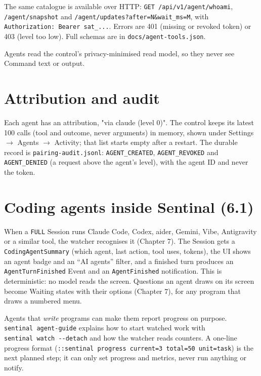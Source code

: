 The same catalogue is available over HTTP: \texttt{GET\ /\allowbreak{}api/\allowbreak{}v1/\allowbreak{}agent/\allowbreak{}whoami}, \texttt{/\allowbreak{}agent/\allowbreak{}snapshot} and \texttt{/\allowbreak{}agent/\allowbreak{}updates?after=\allowbreak{}N\&wait\_\allowbreak{}ms=\allowbreak{}M}, with \texttt{Authorization:\allowbreak{}\ Bearer\ sat\_\allowbreak{}.\allowbreak{}.\allowbreak{}.\allowbreak{}}. Errors are 401 (missing or revoked token) or 403 (level too low). Full schemas are in \texttt{docs/\allowbreak{}agent-{}\allowbreak{}tools.\allowbreak{}json}.

Agents read the control's privacy-minimised read model, so they never see Command text or output.

\section{\texorpdfstring{Attribution and audit}{Attribution and audit}}

Each agent has an attribution, "via claude (level 0)". The control keeps its latest 100 calls (tool and outcome, never arguments) in memory, shown under Settings $\rightarrow$ Agents $\rightarrow$ Activity; that list starts empty after a restart. The durable record is \texttt{pairing-{}\allowbreak{}audit.\allowbreak{}jsonl}: \texttt{AGENT\_\allowbreak{}CREATED}, \texttt{AGENT\_\allowbreak{}REVOKED} and \texttt{AGENT\_\allowbreak{}DENIED} (a request above the agent's level), with the agent ID and never the token.

\section{\texorpdfstring{Coding agents inside Sentinal (6.1)}{Coding agents inside Sentinal (6.1)}}

When a \texttt{FULL} Session runs Claude Code, Codex, aider, Gemini, Vibe, Antigravity or a similar tool, the watcher recognises it (Chapter 7). The Session gets a \texttt{CodingAgentSummary} (which agent, last action, tool uses, tokens), the UI shows an agent badge and an ``AI agents'' filter, and a finished turn produces an \texttt{AgentTurnFinished} Event and an \texttt{AgentFinished} notification. This is deterministic: no model reads the screen. Questions an agent draws on its screen become Waiting states with their options (Chapter 7), for any program that draws a numbered menu.

Agents that \emph{write} programs can make them report progress on purpose. \texttt{sentinal\ agent-{}\allowbreak{}guide} explains how to start watched work with \texttt{sentinal\ watch\ -{}\allowbreak{}-{}\allowbreak{}detach} and how the watcher reads counters. A one-line progress format (\texttt{::sentinal\ progress\ current=3\ total=50\ unit=task}) is the next planned step; it can only set progress and metrics, never run anything or notify.

